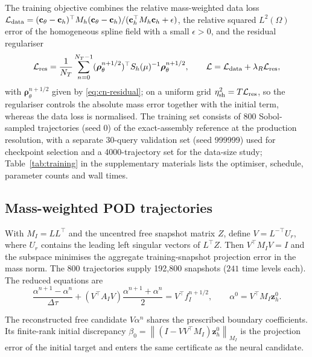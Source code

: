 \documentclass[hidelinks]{siamart251216}
\newcommand{\Mh}{M_h}
\newcommand{\Sh}{S_h}
\newcommand{\norm}[1]{\left\lVert #1\right\rVert}
\newcommand{\dt}{\Delta\tau}
\newcommand{\etaSharp}{\eta_{\mathrm{sh}}}
\newcommand{\cc}{\mathbf c}
\newcommand{\rr}{\bm\rho}
\newcommand{\zz}{\mathbf z}
\begin{document}
The training objective combines the relative mass-weighted data loss
$\mathcal L_{\rm data}=(\cc_\theta-\cc_h)^\top\Mh(\cc_\theta-\cc_h)/(\cc_h^\top\Mh\cc_h+\epsilon)$,
the relative squared $L^2(\Omega)$ error of the homogeneous spline field with a small
$\epsilon>0$, and the residual regulariser
\begin{equation}
 \mathcal L_{\rm res}
 =\frac{1}{N_T}\sum_{n=0}^{N_T-1}
 (\rr_\theta^{n+1/2})^\top\Sh(\mu)^{-1}\rr_\theta^{n+1/2},
 \qquad \mathcal L=\mathcal L_{\rm data}+\lambda_R\mathcal L_{\rm res},
 \label{eq:residual-loss}
\end{equation}
with $\rr_\theta^{n+1/2}$ given by \eqref{eq:cn-residual}; on a uniform grid
$\etaSharp^2=T\mathcal L_{\rm res}$, so the regulariser controls the absolute mass error together
with the initial term, whereas the data loss is normalised.  The training set consists of 800
Sobol-sampled trajectories (seed 0) of the exact-assembly reference at the production resolution,
with a separate 30-query validation set (seed 999999) used for checkpoint selection and a
4000-trajectory set for the data-size study; Table~\ref{tab:training} in the supplementary materials
lists the optimiser, schedule, parameter counts and wall times.

\subsection{Mass-weighted POD trajectories}
\label{ssec:pod-construction}
With $M_I=LL^\top$ and the uncentred free snapshot matrix $Z$, define
$V=L^{-\top}U_r$, where $U_r$ contains the leading left singular vectors of
$L^\top Z$. Then $V^\top M_IV=I$ and the subspace minimises the aggregate
training-snapshot projection error in the mass norm. The 800 trajectories
supply 192,800 snapshots ($241$ time levels each). The reduced equations are
\begin{equation}
 \frac{\alpha^{n+1}-\alpha^n}{\dt}
 + (V^\top A_I V)\frac{\alpha^{n+1}+\alpha^n}{2}
 = V^\top f_I^{n+1/2},\qquad
 \alpha^0=V^\top M_I \zz_h^0.
 \label{eq:repaired-pod-cn}
\end{equation}

The reconstructed free candidate $V\alpha^n$ shares the prescribed boundary
coefficients. Its finite-rank initial discrepancy $\beta_0=\norm{(I-VV^\top M_I)\zz_h^0}_{M_I}$
is the projection error of the initial target and enters the same certificate as the neural
candidate.
\end{document}
